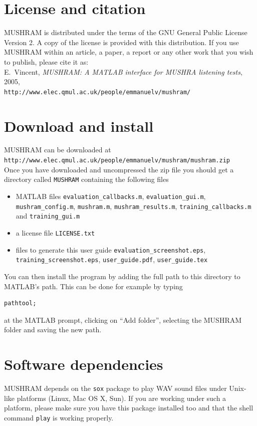 \documentclass[11pt,a4paper]{book}
\begin{document}
\section{License and citation}
MUSHRAM is distributed under the terms of the GNU General Public License Version 2. A copy of the license is provided with this distribution. If you use MUSHRAM within an article, a paper, a report or any other work that you wish to publish, please cite it as:\\[.5em]
E.~Vincent, {\it MUSHRAM: A MATLAB interface for MUSHRA listening tests}, 2005,\\
\texttt{http://www.elec.qmul.ac.uk/people/emmanuelv/mushram/}

\section{Download and install}
MUSHRAM can be downloaded at\\[.5em]
\texttt{http://www.elec.qmul.ac.uk/people/emmanuelv/mushram/mushram.zip}\\[.5em]
Once you have downloaded and uncompressed the zip file you should get a directory called \texttt{MUSHRAM} containing the following files
\begin{itemize}
\item MATLAB files \texttt{evaluation\_callbacks.m}, \texttt{evaluation\_gui.m}, \texttt{mushram\_config.m}, \texttt{mushram.m}, \texttt{mushram\_results.m}, \texttt{training\_callbacks.m} and \texttt{training\_gui.m}
\item a license file \texttt{LICENSE.txt}
\item files to generate this user guide \texttt{evaluation\_screenshot.eps}, \texttt{training\_screenshot.eps}, \texttt{user\_guide.pdf}, \texttt{user\_guide.tex}
\end{itemize}
You can then install the program by adding the full path to this directory to MATLAB's path. This can be done for example by typing
\begin{verbatim}
pathtool;
\end{verbatim}
at the MATLAB prompt, clicking on ``Add folder'', selecting the MUSHRAM folder and saving the new path.

\section{Software dependencies}
MUSHRAM depends on the \texttt{sox} package to play WAV sound files under Unix-like platforms (Linux, Mac OS X, Sun). If you are working under such a platform, please make sure you have this package installed too and that the shell command \texttt{play} is working properly.
\vfill
\end{document}
